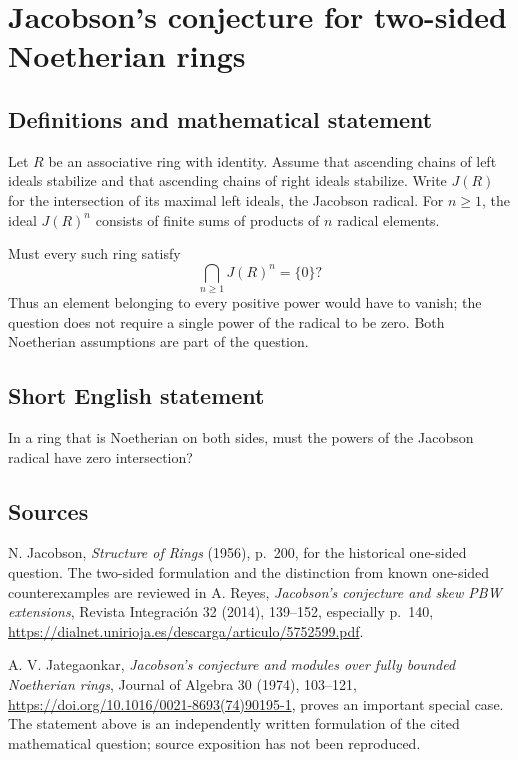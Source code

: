 \documentclass{article}
\begin{document}
\section*{Jacobson's conjecture for two-sided Noetherian rings}
\subsection{Definitions and mathematical statement}
Let $R$ be an associative ring with identity. Assume that ascending chains of
left ideals stabilize and that ascending chains of right ideals stabilize.
Write $J(R)$ for the intersection of its maximal left ideals, the Jacobson
radical. For $n\geq1$, the ideal $J(R)^n$ consists of finite sums of products
of $n$ radical elements.

Must every such ring satisfy
\[
 \bigcap_{n\geq1}J(R)^n=\{0\}?
\]
Thus an element belonging to every positive power would have to vanish;
the question does not require a single power of the radical to be zero.
Both Noetherian assumptions are part of the question.

\subsection{Short English statement}
In a ring that is Noetherian on both sides, must the powers of the Jacobson
radical have zero intersection?

\subsection{Sources}
N. Jacobson, \emph{Structure of Rings} (1956), p.\ 200, for the historical
one-sided question. The two-sided formulation and the distinction from known
one-sided counterexamples are reviewed in A. Reyes,
\emph{Jacobson's conjecture and skew PBW extensions}, Revista Integraci\'on
32 (2014), 139--152, especially p.\ 140,
\url{https://dialnet.unirioja.es/descarga/articulo/5752599.pdf}.

A. V. Jategaonkar, \emph{Jacobson's conjecture and modules over fully bounded
Noetherian rings}, Journal of Algebra 30 (1974), 103--121,
\url{https://doi.org/10.1016/0021-8693(74)90195-1}, proves an important
special case. The statement above is an independently written formulation
of the cited mathematical question; source exposition has not been reproduced.
\end{document}
